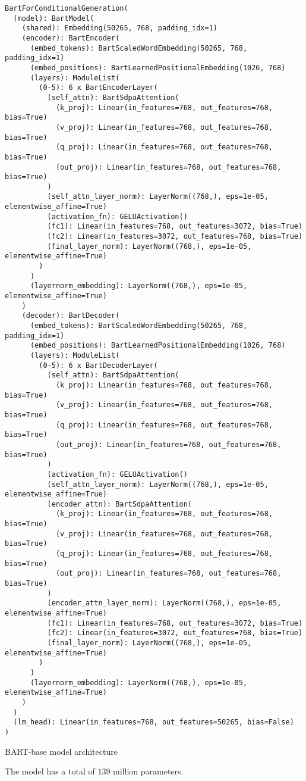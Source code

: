    \begin{listing}[H]
                \begin{verbatim}
BartForConditionalGeneration(
  (model): BartModel(
    (shared): Embedding(50265, 768, padding_idx=1)
    (encoder): BartEncoder(
      (embed_tokens): BartScaledWordEmbedding(50265, 768, padding_idx=1)
      (embed_positions): BartLearnedPositionalEmbedding(1026, 768)
      (layers): ModuleList(
        (0-5): 6 x BartEncoderLayer(
          (self_attn): BartSdpaAttention(
            (k_proj): Linear(in_features=768, out_features=768, bias=True)
            (v_proj): Linear(in_features=768, out_features=768, bias=True)
            (q_proj): Linear(in_features=768, out_features=768, bias=True)
            (out_proj): Linear(in_features=768, out_features=768, bias=True)
          )
          (self_attn_layer_norm): LayerNorm((768,), eps=1e-05, elementwise_affine=True)
          (activation_fn): GELUActivation()
          (fc1): Linear(in_features=768, out_features=3072, bias=True)
          (fc2): Linear(in_features=3072, out_features=768, bias=True)
          (final_layer_norm): LayerNorm((768,), eps=1e-05, elementwise_affine=True)
        )
      )
      (layernorm_embedding): LayerNorm((768,), eps=1e-05, elementwise_affine=True)
    )
    (decoder): BartDecoder(
      (embed_tokens): BartScaledWordEmbedding(50265, 768, padding_idx=1)
      (embed_positions): BartLearnedPositionalEmbedding(1026, 768)
      (layers): ModuleList(
        (0-5): 6 x BartDecoderLayer(
          (self_attn): BartSdpaAttention(
            (k_proj): Linear(in_features=768, out_features=768, bias=True)
            (v_proj): Linear(in_features=768, out_features=768, bias=True)
            (q_proj): Linear(in_features=768, out_features=768, bias=True)
            (out_proj): Linear(in_features=768, out_features=768, bias=True)
          )
          (activation_fn): GELUActivation()
          (self_attn_layer_norm): LayerNorm((768,), eps=1e-05, elementwise_affine=True)
          (encoder_attn): BartSdpaAttention(
            (k_proj): Linear(in_features=768, out_features=768, bias=True)
            (v_proj): Linear(in_features=768, out_features=768, bias=True)
            (q_proj): Linear(in_features=768, out_features=768, bias=True)
            (out_proj): Linear(in_features=768, out_features=768, bias=True)
          )
          (encoder_attn_layer_norm): LayerNorm((768,), eps=1e-05, elementwise_affine=True)
          (fc1): Linear(in_features=768, out_features=3072, bias=True)
          (fc2): Linear(in_features=3072, out_features=768, bias=True)
          (final_layer_norm): LayerNorm((768,), eps=1e-05, elementwise_affine=True)
        )
      )
      (layernorm_embedding): LayerNorm((768,), eps=1e-05, elementwise_affine=True)
    )
  )
  (lm_head): Linear(in_features=768, out_features=50265, bias=False)
)
                \end{verbatim}
                \caption{BART-base model architecture}
                \label{lst:bart_base_architecture}
            \end{listing}
The model has a total of \(139\) million parameters.

